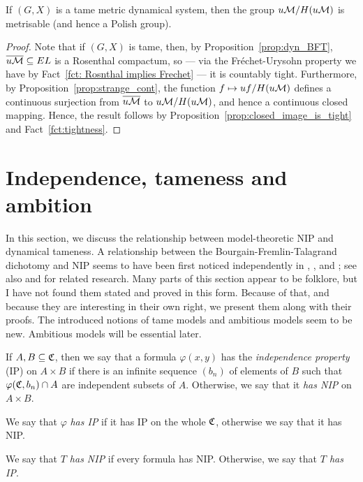 	\begin{prop}\label{prop:NIP gives metrizability}
		If $(G,X)$ is a tame metric dynamical system, then the group $u{\mathcal M}/H(u{\mathcal M})$ is metrisable (and hence a Polish group).
	\end{prop}
	\begin{proof}
		Note that if $(G,X)$ is tame, then, by Proposition~\ref{prop:dyn_BFT}, $\overline{u{\mathcal M}}\subseteq EL$ is a Rosenthal compactum, so --- via the Fréchet-Urysohn property we have by Fact~\ref{fct: Rosnthal implies Frechet} --- it is countably tight. Furthermore, by Proposition~\ref{prop:strange_cont}, the function $f\mapsto uf/H(u{\mathcal M})$ defines a continuous surjection from $\overline{u{\mathcal M}}$ to $u{\mathcal M}/H(u{\mathcal M})$, and hence a continuous closed mapping. Hence, the result follows by Proposition~\ref{prop:closed_image_is_tight} and Fact~\ref{fct:tightness}.
	\end{proof}
	
	
	
	\section{Independence, tameness and ambition}\label{section: independence, tameness and ambition}
	In this section, we discuss the relationship between model-theoretic NIP and dynamical tameness. A relationship between the Bourgain-Fremlin-Talagrand dichotomy and NIP seems to have been first noticed independently in \cite{CS18}, \cite{Kha14}, and \cite{Ib16}; see also \cite{Sim15} and \cite{KhP17} for related research. Many parts of this section appear to be folklore, but I have not found them stated and proved in this form. Because of that, and because they are interesting in their own right, we present them along with their proofs. The introduced notions of tame models and ambitious models seem to be new. Ambitious models will be essential later.
	
	
	\begin{dfn}
		\label{dfn:NIP_formula_theory}
		If $A,B\subseteq {\mathfrak C}$, then we say that a formula $\varphi(x,y)$ has the \emph{independence property} (IP) on $A\times B$ if there is an infinite sequence $(b_n)$ of elements of $B$ such that $\varphi({\mathfrak C},b_n)\cap A$ are independent subsets of $A$. Otherwise, we say that it \emph{has NIP} on $A\times B$.
		
		We say that $\varphi$ \emph{has IP} if it has IP on the whole ${\mathfrak C}$, otherwise we say that it has NIP.
		
		We say that \emph{$T$ has NIP} if every formula has NIP. Otherwise, we say that \emph{$T$ has IP}.
		\xqed{\lozenge}
	\end{dfn}
	
